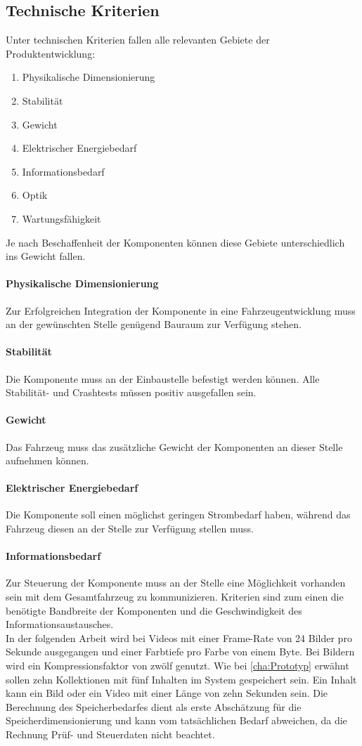 \subsection{Technische Kriterien}
Unter technischen Kriterien fallen alle relevanten Gebiete der Produktentwicklung:
\begin{enumerate}
	\item Physikalische Dimensionierung
	\item Stabilität
	\item Gewicht
	\item Elektrischer Energiebedarf
	\item Informationsbedarf
	\item Optik
	\item Wartungsfähigkeit
\end{enumerate}
Je nach Beschaffenheit der Komponenten können diese Gebiete unterschiedlich ins Gewicht fallen.
\paragraph{Physikalische Dimensionierung}
Zur Erfolgreichen Integration der Komponente in eine Fahrzeugentwicklung muss an der gewünschten Stelle genügend Bauraum zur Verfügung stehen.
\paragraph{Stabilität}
Die Komponente muss an der Einbaustelle befestigt werden können. Alle Stabilität- und Crashtests müssen positiv ausgefallen sein.
\paragraph{Gewicht}
Das Fahrzeug muss das zusätzliche Gewicht der Komponenten an dieser Stelle aufnehmen können.
\paragraph{Elektrischer Energiebedarf}
Die Komponente soll einen möglichst geringen Strombedarf haben, während das Fahrzeug diesen an der Stelle zur Verfügung stellen muss.
\paragraph{Informationsbedarf}
Zur Steuerung der Komponente muss an der Stelle eine Möglichkeit vorhanden sein mit dem Gesamtfahrzeug zu kommunizieren. Kriterien sind zum einen die benötigte Bandbreite der Komponenten und die Geschwindigkeit des Informationsaustausches. \\
In der folgenden Arbeit wird bei Videos mit einer Frame-Rate von 24 Bilder pro Sekunde ausgegangen und einer Farbtiefe pro Farbe von einem Byte. Bei Bildern wird ein Kompressionsfaktor von zwölf genutzt. Wie bei \ref{cha:Prototyp} erwähnt sollen zehn Kollektionen mit fünf Inhalten im System gespeichert sein. Ein Inhalt kann ein Bild oder ein Video mit einer Länge von zehn Sekunden sein.
Die Berechnung des Speicherbedarfes dient als erste Abschätzung für die Speicherdimensionierung und kann vom tatsächlichen Bedarf abweichen, da die Rechnung Prüf- und Steuerdaten nicht beachtet.
